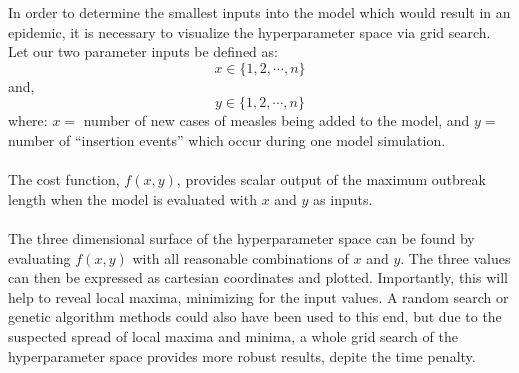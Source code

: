 \documentclass[../Paper.tex]{subfiles}
\begin{document}
  In order to determine the smallest inputs into the model which would result in
  an epidemic, it is necessary to visualize the hyperparameter space via grid search.
  \\
  Let our two parameter inputs be defined as:
  \begin{equation}
    x \in \{1, 2, \cdots, n \}
  \end{equation}
  and,
  \begin{equation}
    y \in \{1, 2, \cdots, n \}
  \end{equation}
  where: $x =$ number of new cases of measles being added to the model, and
  $y =$ number of ``insertion events'' which occur during one model simulation.\\
  \\
  The cost function, $f(x, y)$, provides scalar output of the maximum outbreak length
  when the model is evaluated with $x$ and $y$ as inputs.\\
  \\
  The three dimensional surface of the hyperparameter space can be found by evaluating $f(x,y)$
  with all reasonable combinations of $x$ and $y$. The three values can then be
  expressed as cartesian coordinates and plotted. Importantly, this will help to reveal
  local maxima, minimizing for the input values. A random search or
  genetic algorithm methods could also have been used to this end, but due to the
  suspected spread of local maxima and minima, a whole grid search of the
  hyperparameter space provides more robust results, depite the time penalty.
  \\
  
  \clearpage
\end{document}
